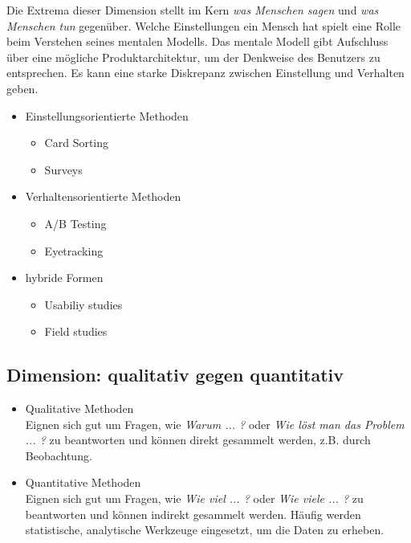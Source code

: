 \documentclass{article}
\begin{document}
Die Extrema dieser Dimension stellt im Kern \textit{was Menschen sagen} und \textit{was Menschen tun} gegenüber. Welche Einstellungen ein Mensch hat spielt eine Rolle beim Verstehen seines mentalen Modells. Das mentale Modell gibt Aufschluss über eine mögliche Produktarchitektur, um der Denkweise des Benutzers zu entsprechen. Es kann eine starke Diskrepanz zwischen Einstellung und Verhalten geben.
\begin{itemize}
\item Einstellungsorientierte Methoden
\begin{itemize}
\item Card Sorting
\item Surveys
\end{itemize}

\item Verhaltensorientierte Methoden
\begin{itemize}
\item A/B Testing
\item Eyetracking
\end{itemize}

\item hybride Formen
\begin{itemize}
\item Usabiliy studies
\item Field studies
\end{itemize}
\end{itemize}

\subsection*{Dimension: qualitativ gegen quantitativ}

\begin{itemize}
\item Qualitative Methoden\\
Eignen sich gut um Fragen, wie \textit{Warum ... ?} oder \textit{Wie löst man das Problem ... ?} zu beantworten und können direkt gesammelt werden, z.B. durch Beobachtung.
\item Quantitative Methoden\\
Eignen sich gut um Fragen, wie \textit{Wie viel ... ?} oder \textit{Wie viele ... ?} zu beantworten und können indirekt gesammelt werden. Häufig werden statistische, analytische Werkzeuge eingesetzt, um die Daten zu erheben.
\end{itemize}
\newpage
\end{document}
